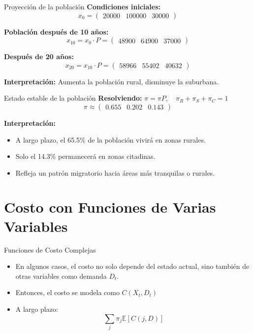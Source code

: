 \documentclass{beamer}
\begin{document}
\begin{frame}{Proyección de la población}
\textbf{Condiciones iniciales:}
\[
x_0 = \begin{pmatrix} 20000 & 100000 & 30000 \end{pmatrix}
\]

\textbf{Población después de 10 años:}
\[
x_{10} = x_0 \cdot P = \boxed{\begin{pmatrix} 48900 & 64900 & 37000 \end{pmatrix}}
\]

\textbf{Después de 20 años:}
\[
x_{20} = x_{10} \cdot P = \boxed{\begin{pmatrix} 58966 & 55402 & 40632 \end{pmatrix}}
\]

\textbf{Interpretación:} Aumenta la población rural, disminuye la suburbana.
\end{frame}

\begin{frame}{Estado estable de la población}
\textbf{Resolviendo:} $\pi = \pi P, \quad \pi_R + \pi_S + \pi_C = 1$
\[
\pi \approx \begin{pmatrix} 0.655 & 0.202 & 0.143 \end{pmatrix}
\]

\textbf{Interpretación:}
\begin{itemize}
  \item A largo plazo, el 65.5\% de la población vivirá en zonas rurales.
  \item Solo el 14.3\% permanecerá en zonas citadinas.
  \item Refleja un patrón migratorio hacia áreas más tranquilas o rurales.
\end{itemize}
\end{frame}

\section{Costo con Funciones de Varias Variables}

\begin{frame}{Funciones de Costo Complejas}
\begin{itemize}
  \item En algunos casos, el costo no solo depende del estado actual, sino también de otras variables como demanda $D_t$.
  \item Entonces, el costo se modela como $C(X_t, D_t)$
  \item A largo plazo:
  \[
  \sum_j \pi_j \mathbb{E}[C(j, D)]
  \]
\end{itemize}
\end{frame}
\end{document}
